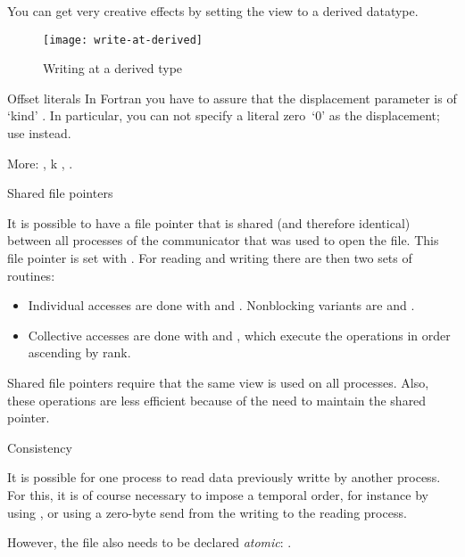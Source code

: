 You can get very creative effects by setting the view to a derived
datatype.

\begin{figure}[ht]
  \label{fig:write-derived}
  \caption{Writing at a derived type}
  \texttt{[image: write-at-derived]}
\end{figure}

\begin{fortrannote}{Offset literals}
  In Fortran you have to assure that the displacement parameter is of
  `kind' . In particular, you can not
  specify a literal zero~`0' as the displacement; use
   instead.
\end{fortrannote}

More:
,
k
,
.

 {Shared file pointers}

It is possible to have a file pointer that is shared (and therefore identical)
between all processes of the communicator that was used to open the file.
This file pointer is set with .
For reading and writing there are then two sets of routines:
\begin{itemize}
\item Individual accesses are done with 
  and .
  Nonblocking variants are 
  and .
\item Collective accesses are done with 
  and , which execute the operations
  in order ascending by rank.
\end{itemize}

Shared file pointers require that the same view is used on all processes.
Also, these operations are less efficient because of the need to maintain the
shared pointer.

 {Consistency}

It is possible for one process to read data previously writte by another process.
For this, it is of course necessary to impose a temporal order,
for instance by using ,
or using a zero-byte send from the writing to the reading process.

However, the file also needs to be declared
\emph{atomic}:
.

